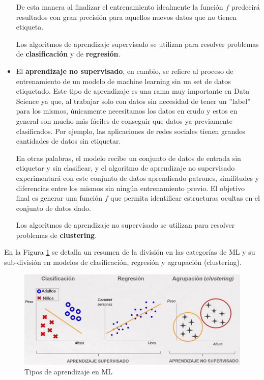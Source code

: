\documentclass[12pt,a4paper]{article}
\begin{document}
\begin{sloppypar}
\begin{itemize}
De esta manera al finalizar el entrenamiento idealmente la función $f$ predecirá resultados con gran precisión para aquellos nuevos datos que no tienen etiqueta. 

Los algoritmos de aprendizaje supervisado se utilizan para resolver problemas de \textbf{clasificación} y de \textbf{regresión}.

\item El \textbf{aprendizaje no supervisado}\cite{intro_clasificacion_ML}, en cambio, se refiere al proceso de entrenamiento de un modelo de machine learning sin un set de datos etiquetado. Este tipo de aprendizaje es una rama muy importante en Data Science ya que, al trabajar solo con datos sin necesidad de tener un ”label” para los mismos, únicamente necesitamos los datos en crudo y estos en general son mucho más fáciles de conseguir que datos ya previamente clasificados. Por ejemplo, las aplicaciones de redes sociales tienen grandes cantidades de datos sin etiquetar.  

En otras palabras, el modelo recibe un conjunto de datos de entrada sin etiquetar y sin clasificar, y el algoritmo de aprendizaje no supervisado experimentará con este conjunto de datos aprendiendo patrones, similitudes y diferencias entre los mismos sin ningún entrenamiento previo. El objetivo final es generar una función $f$ que permita identificar estructuras ocultas en el conjunto de datos dado.

Los algoritmos de aprendizaje no supervisado se utilizan para resolver problemas de \textbf{clustering}.
\end{itemize}

\cleardoublepage
En la Figura \ref{fig:Clasif_algoritmos} se detalla un resumen de la división en las categorías de ML y su sub-división en modelos de clasificación, regresión y agrupación (clustering). 

\begin{figure}[H]    %
  \centering
  \includegraphics[width=1\textwidth]{images/Clasificacion_algoritmos.png}
  \caption[Tipos de aprendizaje en ML]{Tipos de aprendizaje en ML\protect\footnotemark}  
  \label{fig:Clasif_algoritmos}
\end{figure}


\end{sloppypar}
\end{document}
